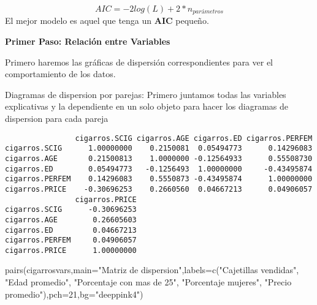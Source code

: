 \documentclass[
  a4paper,
  oneside,
  openany]{book}
\newenvironment{Shaded}{\begin{snugshade}}{\end{snugshade}}
\newcommand{\AttributeTok}[1]{\textcolor[rgb]{0.77,0.63,0.00}{#1}}
\newcommand{\DecValTok}[1]{\textcolor[rgb]{0.00,0.00,0.81}{#1}}
\newcommand{\FunctionTok}[1]{\textcolor[rgb]{0.00,0.00,0.00}{#1}}
\newcommand{\NormalTok}[1]{#1}
\newcommand{\OtherTok}[1]{\textcolor[rgb]{0.56,0.35,0.01}{#1}}
\newcommand{\SpecialCharTok}[1]{\textcolor[rgb]{0.00,0.00,0.00}{#1}}
\newcommand{\StringTok}[1]{\textcolor[rgb]{0.31,0.60,0.02}{#1}}
\begin{document}
\[AIC=-2log(L) +2* n_{parámetros}\]
El mejor modelo es aquel que tenga un \(\textbf{AIC}\) pequeño.

\textbf{Primer Paso: Relación entre Variables}

Primero haremos las gráficas de dispersión correspondientes para ver el comportamiento de los datos.

Diagramas de dispersion por parejas: Primero juntamos todas las variables explicativas y la dependiente en un solo objeto para hacer los diagramas de dispersion para cada pareja

\begin{Shaded}
\end{Shaded}

\begin{verbatim}
                cigarros.SCIG cigarros.AGE cigarros.ED cigarros.PERFEM
cigarros.SCIG      1.00000000    0.2150081  0.05494773      0.14296083
cigarros.AGE       0.21500813    1.0000000 -0.12564933      0.55508730
cigarros.ED        0.05494773   -0.1256493  1.00000000     -0.43495874
cigarros.PERFEM    0.14296083    0.5550873 -0.43495874      1.00000000
cigarros.PRICE    -0.30696253    0.2660560  0.04667213      0.04906057
                cigarros.PRICE
cigarros.SCIG      -0.30696253
cigarros.AGE        0.26605603
cigarros.ED         0.04667213
cigarros.PERFEM     0.04906057
cigarros.PRICE      1.00000000
\end{verbatim}

\begin{Shaded}
\begin{Highlighting}[]
\FunctionTok{pairs}\NormalTok{(cigarrosvars,}\AttributeTok{main=}\StringTok{"Matriz de dispersion"}\NormalTok{,}\AttributeTok{labels=}\FunctionTok{c}\NormalTok{(}\StringTok{"Cajetillas vendidas"}\NormalTok{, }\StringTok{"Edad promedio"}\NormalTok{, }\StringTok{"Porcentaje con mas de 25"}\NormalTok{, }\StringTok{"Porcentaje mujeres"}\NormalTok{, }\StringTok{"Precio promedio"}\NormalTok{),}\AttributeTok{pch=}\DecValTok{21}\NormalTok{,}\AttributeTok{bg=}\StringTok{"deeppink4"}\NormalTok{)}
\end{Highlighting}
\end{Shaded}
\end{document}
